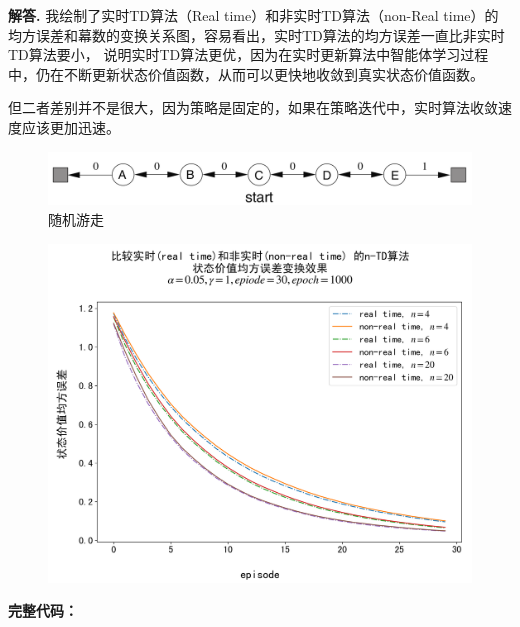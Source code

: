 \documentclass[12pt, a4paper, oneside]{ctexart}
\newenvironment{solution}[1][]{\par\noindent\textbf{#1解答. }}{\smallskip\par}  %
\begin{document}
\begin{solution}
    我绘制了实时TD算法（Real time）和非实时TD算法（non-Real time）的均方误差和幕数的变换关系图，容易看出，实时TD算法的均方误差一直比非实时TD算法要小，
    说明实时TD算法更优，因为在实时更新算法中智能体学习过程中，仍在不断更新状态价值函数，从而可以更快地收敛到真实状态价值函数。
    
    但二者差别并不是很大，因为策略是固定的，如果在策略迭代中，实时算法收敛速度应该更加迅速。
    \begin{figure}[htbp]
        \centering
        \includegraphics[scale=0.4]{figures/123页随机游走.png}
        \caption{随机游走}
    \end{figure}
    \begin{figure}[htbp]
        \centering
        \includegraphics[scale=0.65]{code142/compare (non)real time n-TD.png}
    \end{figure}
    \clearpage
    \textbf{完整代码：}

\end{solution}
\end{document}
